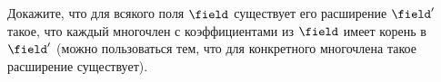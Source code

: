 Докажите, что для всякого поля $\field$ существует его расширение $\field'$ такое, что каждый многочлен с
коэффициентами из $\field$ имеет корень в $\field'$ (можно пользоваться тем, что для конкретного
многочлена такое расширение существует).